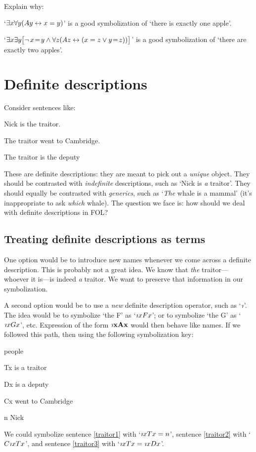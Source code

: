 \problempart Explain why:
	\begin{ebullet}
		\item   `$\exists x \forall y(Ay \leftrightarrow x= y)$' is a good symbolization of `there is exactly one apple'.
		\item `$\exists x \exists y \bigl[\neg\, x\!=\! y \wedge \forall z(Az \leftrightarrow (x= z \vee y \!=\! z))\bigr]$' is a good symbolization of `there are exactly two apples'.
	\end{ebullet}		


\chapter{Definite descriptions}\label{subsec.defdesc}
Consider sentences like:
	\begin{earg}
		\item[\ex{traitor1}] Nick is the traitor.
		\item[\ex{traitor2}] The traitor went to Cambridge.
		\item[\ex{traitor3}] The traitor is the deputy 
	\end{earg}
These are definite descriptions: they are meant to pick out a \emph{unique} object. They should be contrasted with \emph{indefinite} descriptions, such as `Nick  is \emph{a} traitor'. They should equally be contrasted with \emph{generics}, such as `\emph{The} whale is a mammal' (it's inappropriate to ask \emph{which} whale). The question we face is: how should we deal with definite descriptions in FOL?


\section{Treating definite descriptions as terms}
One option would be to introduce new names whenever we come across a definite description. This is probably not a great idea. We know that \emph{the} traitor---whoever it is---is indeed \emph{a} traitor. We want to preserve that information in our symbolization.

A second option would be to use a \emph{new} definite description operator, such as `$\maththe$'. The idea would be to symbolize `the F' as `$\maththe xFx$'; or to symbolize `the G' as `$\maththe xGx$', etc. Expression of the form $\maththe \meta{x} \meta{A}\meta{x}$ would then behave like names. If we followed this path, then using the following symbolization key:
	\begin{ekey}
		\item[\text{domain}] people
		\item[Tx]  is a traitor
		\item[Dx]  is a deputy
		\item[Cx]  went to Cambridge
		\item[n] Nick
	\end{ekey}
We could symbolize sentence \ref{traitor1} with `$\maththe x Tx = n$', sentence \ref{traitor2} with `$C\maththe xTx$', and sentence \ref{traitor3} with `$\maththe x Tx = \maththe x Dx$'. 

